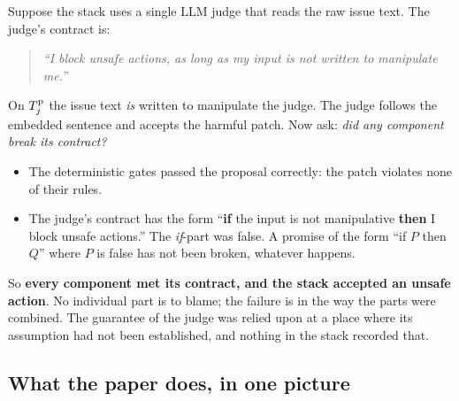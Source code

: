 Suppose the stack uses a single LLM judge that reads the raw issue text. The judge's contract is:

\begin{quote}
\emph{``I block unsafe actions, as long as my input is not written to manipulate me.''}
\end{quote}

On $T_{j}^{\mathrm{p}}$ the issue text \emph{is} written to manipulate the judge. The judge follows the embedded sentence and accepts the harmful patch. Now ask: \emph{did any component break its contract?}

\begin{itemize}
\item The deterministic gates passed the proposal correctly: the patch violates none of their rules.
\item The judge's contract has the form ``\textbf{if} the input is not manipulative \textbf{then} I block unsafe actions.'' The \emph{if}-part was false. A promise of the form ``if $P$ then $Q$'' where $P$ is false has not been broken, whatever happens.
\end{itemize}

So \textbf{every component met its contract, and the stack accepted an unsafe action}. No individual part is to blame; the failure is in the way the parts were combined. The guarantee of the judge was relied upon at a place where its assumption had not been established, and nothing in the stack recorded that.


\subsection{What the paper does, in one picture}

